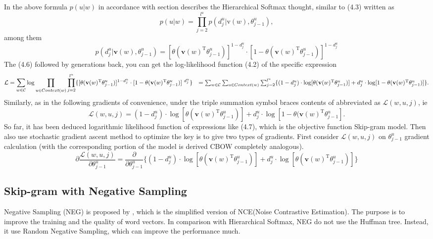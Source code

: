 In the above formula $p(u|w)$ in accordance with section describes the Hierarchical Softmax thought, similar to (4.3) written as
$$p(u|w)=\prod_{j = 2}^{l^u}p(d^u_j|\text{v}(w),\theta^u_{j-1}), $$
among them
\begin{equation}
p(d^u_j|\mathbf{v}(w),\theta^u_{j-1})=[\theta(\mathbf{v}(w)^{\mathrm{T}}\theta^u_{j-1})]^{1-d^u_j}\cdot[1-\theta(\mathbf{v}(w)^{\mathrm{T}}\theta^u_{j-1})]^{1-d^u_j}
\end{equation}
The (4.6) followed by generations back, you can get the log-likelihood function (4.2) of the specific expression
\begin{equation}
\mathcal{L}=\sum_{w\in\mathcal{C}}\log\prod_{u\in Context(w)}\prod_{j=2}^{l^u}\{[\theta(\mathbf{v}(w)^{\mathrm{T}}\theta^u_{j-1})]^{1-d^u_j}\cdot[1-\theta(\mathbf{v}(w)^{\mathrm{T}}\theta^u_{j-1})]^{\ d^u_j}\} \\
\ \ \ $$ $$=\sum_{w\in\mathcal{C}}\sum_{u\in Context(w)}\sum_{j=2}^{l^u}\{(1-d^u_j)\cdot\log[\theta(\mathbf{v}(w)^{\mathrm{T}}\theta^u_{j-1})]+d^u_j\cdot\log[1-\theta(\mathbf {v}(w)^{\mathrm{T}}\theta^u_{j-1})]\}.
\end{equation}
Similarly, as in the following gradients of convenience, under the triple summation symbol braces contents of abbreviated as $\mathcal{L}(w,u,j)$, ie
$$\mathcal{L}(w,u,j)=(1-d^u_j)\cdot\log[\theta(\mathbf{v}(w)^{\mathrm{T}}\theta^u_{j-1})]+d^u_j\cdot\log[1-\theta(\mathbf{v}(w)^{\mathrm{T}}\theta^u_{j-1}]. $$
So far, it has been deduced logarithmic likelihood function of expressions like (4.7), which is the objective function Skip-gram model. Then also use stochastic gradient ascent method to optimize the key is to give two types of gradients.
First consider $\mathcal{L}(w,u,j)$ on $\theta^u_{j-1}$ gradient calculation (with the corresponding portion of the model is derived CBOW completely analogous).
$$\partial\frac{\mathcal{L}(w, u, j)}{\partial\theta^u_{j-1}}=\frac{\partial}{\partial\theta^u_{j-1}}\{(1-d^u_j)\cdot\log[\theta(\mathbf{v}(w)^{\mathrm{T}}\theta^u_{j-1})]+d^u_j\cdot\log[\theta(\mathbf{v}(w)^{\mathrm{T}}\theta^u_{j-1})]\}$$

\subsection{Skip-gram with Negative Sampling}

Negative Sampling (NEG) is proposed by \cite{MikolovSutskeverEtAl2013}, which is the simplified version of NCE(Noise Contrastive Estimation). The purpose is to improve the training and the quality of word vectors. In comparison with Hierarchical Softmax, NEG do not use the Huffman tree. Instead, it use Random Negative Sampling, which can improve the performance much.

